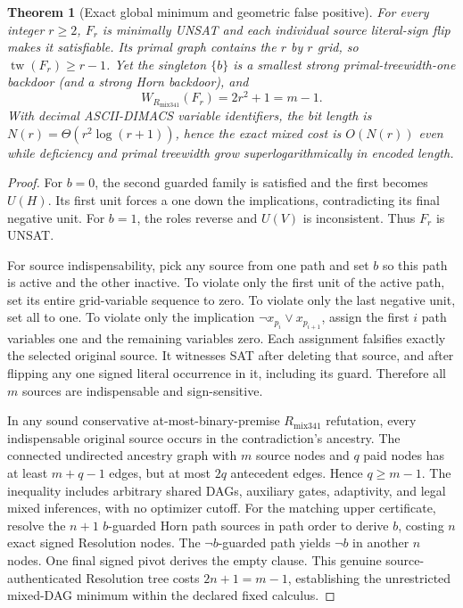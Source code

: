 \documentclass[11pt]{article}
\newtheorem{theorem}{Theorem}
\begin{document}
\begin{theorem}[Exact global minimum and geometric false positive]
For every integer $r\ge2$, $F_r$ is minimally UNSAT and each individual source literal-sign flip makes it satisfiable. Its primal graph contains the $r$ by $r$ grid, so $\operatorname{tw}(F_r)\ge r-1$. Yet the singleton $\{b\}$ is a smallest strong primal-treewidth-one backdoor (and a strong Horn backdoor), and
\[
\boxed{W_{R_{\mathrm{mix341}}}(F_r)=2r^2+1=m-1.}
\]
With decimal ASCII-DIMACS variable identifiers, the bit length is $N(r)=\Theta(r^2\log(r+1))$, hence the exact mixed cost is $O(N(r))$ even while deficiency and primal treewidth grow superlogarithmically in encoded length.
\end{theorem}
\begin{proof}
For $b=0$, the second guarded family is satisfied and the first becomes $U(H)$. Its first unit forces a one down the implications, contradicting its final negative unit. For $b=1$, the roles reverse and $U(V)$ is inconsistent. Thus $F_r$ is UNSAT.

For source indispensability, pick any source from one path and set $b$ so this path is active and the other inactive. To violate only the first unit of the active path, set its entire grid-variable sequence to zero. To violate only the last negative unit, set all to one. To violate only the implication $\neg x_{p_i}\lor x_{p_{i+1}}$, assign the first $i$ path variables one and the remaining variables zero. Each assignment falsifies exactly the selected original source. It witnesses SAT after deleting that source, and after flipping any one signed literal occurrence in it, including its guard. Therefore all $m$ sources are indispensable and sign-sensitive.

In any sound conservative at-most-binary-premise $R_{\mathrm{mix341}}$ refutation, every indispensable original source occurs in the contradiction's ancestry. The connected undirected ancestry graph with $m$ source nodes and $q$ paid nodes has at least $m+q-1$ edges, but at most $2q$ antecedent edges. Hence $q\ge m-1$. The inequality includes arbitrary shared DAGs, auxiliary gates, adaptivity, and legal mixed inferences, with no optimizer cutoff. For the matching upper certificate, resolve the $n+1$ $b$-guarded Horn path sources in path order to derive $b$, costing $n$ exact signed Resolution nodes. The $\neg b$-guarded path yields $\neg b$ in another $n$ nodes. One final signed pivot derives the empty clause. This genuine source-authenticated Resolution tree costs $2n+1=m-1$, establishing the unrestricted mixed-DAG minimum within the declared fixed calculus.


\end{proof}
\end{document}
